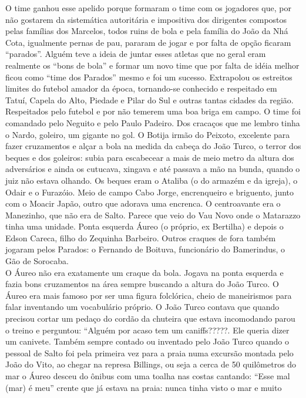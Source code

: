 \documentclass[12pt,brazil,]{book}
\begin{document}
O time ganhou esse apelido porque formaram o time com os jogadores que,
por não gostarem da sistemática autoritária e impositiva dos dirigentes
compostos pelas famílias dos Marcelos, todos ruins de bola e pela
família do João da Nhá Cota, igualmente pernas de pau, pararam de jogar
e por falta de opção ficaram ``parados''. Alguém teve a ideia de juntar
esses atletas que no geral eram realmente os ``bons de bola'' e formar
um novo time que por falta de idéia melhor ficou como ``time dos
Parados'' mesmo e foi um sucesso. Extrapolou os estreitos limites do
futebol amador da época, tornando-se conhecido e respeitado em Tatuí,
Capela do Alto, Piedade e Pilar do Sul e outras tantas cidades da
região. Respeitados pelo futebol e por não temerem uma boa briga em
campo. O time foi comandado pelo Neguito e pelo Paulo Padeiro. Dos
cracaços que me lembro tinha o Nardo, goleiro, um gigante no gol. O
Botija irmão do Peixoto, excelente para fazer cruzamentos e alçar a bola
na medida da cabeça do João Turco, o terror dos beques e dos goleiros:
subia para escabecear a mais de meio metro da altura dos adversários e
ainda os cutucava, xingava e até passava a mão na bunda, quando o juiz
não estava olhando. Os beques eram o Ataliba (o do armazém e da igreja),
o Odair e o Furazóio. Meio de campo Cabo Jorge, encrenqueiro e
briguento, junto com o Moacir Japão, outro que adorava uma encrenca. O
centroavante era o Manezinho, que não era de Salto. Parece que veio do
Vau Novo onde o Matarazzo tinha uma unidade. Ponta esquerda Áureo (o
próprio, ex Bertilha) e depois o Edson Careca, filho do Zequinha
Barbeiro. Outros craques de fora também jogaram pelos Parados: o
Fernando de Boituva, funcionário do Bamerindus, o Gão de Sorocaba.\\
O Áureo não era exatamente um craque da bola. Jogava na ponta esquerda e
fazia bons cruzamentos na área sempre buscando a altura do João Turco. O
Áureo era mais famoso por ser uma figura folclórica, cheio de
maneirismos para falar inventando um vocabulário próprio. O João Turco
contava que quando precisou cortar um pedaço do cordão da chuteira que
estava incomodando parou o treino e perguntou: ``Alguém por acaso tem um
caniffs?????. Ele queria dizer um canivete. Também sempre contado ou
inventado pelo João Turco quando o pessoal de Salto foi pela primeira
vez para a praia numa excursão montada pelo João do Vito, ao chegar na
represa Billings, ou seja a cerca de 50 quilômetros do mar o Áureo
desceu do ônibus com uma toalha nas costas cantando: ``Esse mal (mar) é
meu'' crente que já estava na praia: nunca tinha visto o mar e muito
\end{document}
